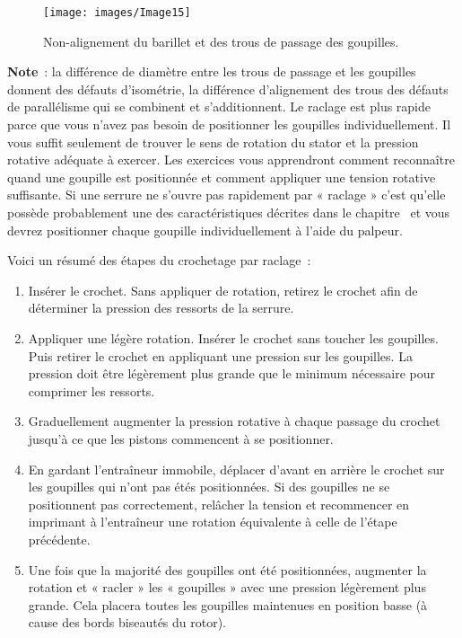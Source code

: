 \documentclass[a4paper,french,11pt,twoside]{report}
\begin{document}
\begin{figure}[ht]
  \begin{center}
    \texttt{[image: images/Image15]}
    \caption{Non-alignement du barillet et des trous de passage des goupilles.\label{non-alignement}}
  \end{center}
\end{figure}


\textbf{Note}~: la différence de diamètre entre les trous de passage et les goupilles donnent des défauts d'isométrie, la différence d'alignement des trous des défauts de parallélisme qui se combinent et s'additionnent. Le raclage est plus rapide parce que vous n'avez pas besoin de positionner les goupilles individuellement. Il vous suffit seulement de trouver le sens de rotation du stator et la pression rotative adéquate à exercer. Les exercices vous apprendront comment reconnaître quand une goupille est positionnée et comment appliquer une tension rotative suffisante. Si une serrure ne s'ouvre pas rapidement par « raclage » c'est qu'elle possède probablement une des caractéristiques décrites dans le chapitre~ et vous devrez positionner chaque goupille individuellement à l'aide du palpeur.

Voici un résumé des étapes du crochetage par raclage~:

\begin{enumerate}
    \item{Insérer le crochet. Sans appliquer de rotation, retirez le crochet afin de déterminer la pression des ressorts de la serrure.}
    \item{Appliquer une légère rotation. Insérer le crochet sans  toucher les goupilles. Puis retirer le crochet en appliquant une  pression sur les goupilles. La pression doit être légèrement plus grande  que le minimum nécessaire pour comprimer les ressorts.}
    \item{Graduellement augmenter la pression rotative à chaque passage du crochet jusqu'à ce que les pistons commencent à se positionner.}
    \item{En gardant l'entraîneur immobile, déplacer d'avant en  arrière le crochet sur les goupilles qui n'ont pas étés positionnées. Si  des goupilles ne se positionnent pas correctement, relâcher la tension  et recommencer en imprimant à l'entraîneur une rotation équivalente à  celle de l'étape précédente.}
    \item{Une fois que la majorité des goupilles ont été  positionnées, augmenter la rotation et « racler » les  « goupilles » avec une pression légèrement plus grande. Cela  placera toutes les goupilles maintenues en position basse (à cause des bords biseautés du rotor).}
\end{enumerate}
\end{document}
